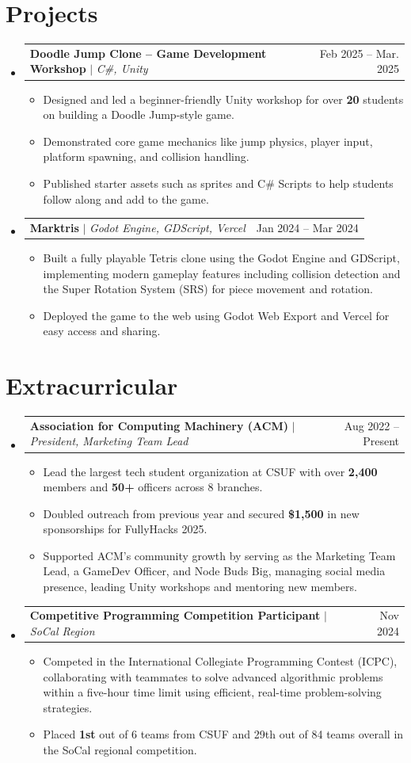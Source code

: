 \documentclass[letterpaper,11pt]{article}
\makeatletter
\newcommand{\resumeItem}[1]{
  \item\small{
    {#1 \vspace{-2pt}}
  }
}
\newcommand{\resumeProjectHeading}[2]{
    \item
    \begin{tabular*}{0.97\textwidth}{l@{\extracolsep{\fill}}r}
      \small#1 & #2 \\
    \end{tabular*}\vspace{-7pt}
}
\newcommand{\resumeSubHeadingListStart}{\begin{itemize}[leftmargin=0.15in, label={}]}
\newcommand{\resumeSubHeadingListEnd}{\end{itemize}}
\newcommand{\resumeItemListStart}{\begin{itemize}}
\newcommand{\resumeItemListEnd}{\end{itemize}\vspace{-5pt}}
\makeatother
\begin{document}
\section{Projects}
    \resumeSubHeadingListStart
      \resumeProjectHeading
          {\textbf{Doodle Jump Clone – Game Development Workshop} $|$ \emph{C\#, Unity}}{Feb 2025 -- Mar. 2025}
          \resumeItemListStart
            \resumeItem{Designed and led a beginner-friendly Unity workshop for over \textbf{20} students on building a Doodle Jump-style game.}
            \resumeItem{Demonstrated core game mechanics like jump physics, player input, platform spawning, and collision handling.}
            \resumeItem{Published starter assets such as sprites and C\# Scripts to help students follow along and add to the game.}
          \resumeItemListEnd
      \resumeProjectHeading
          {\textbf{Marktris} $|$ \emph{Godot Engine, GDScript, Vercel}}{Jan 2024 -- Mar 2024}
          \resumeItemListStart
            \resumeItem{Built a fully playable Tetris clone using the Godot Engine and GDScript, implementing modern gameplay features including collision detection and the Super Rotation System (SRS) for piece movement and rotation.}
            \resumeItem{Deployed the game to the web using Godot Web Export and Vercel for easy access and sharing.}
          \resumeItemListEnd
    \resumeSubHeadingListEnd

\section{Extracurricular}

    \resumeSubHeadingListStart
    
      \resumeProjectHeading
          {\textbf{Association for Computing Machinery (ACM)} $|$ \emph{President, Marketing Team Lead}}{Aug 2022 -- Present}
          \resumeItemListStart
            \resumeItem{Lead the largest tech student organization at CSUF with over \textbf{2,400} members and \textbf{50+} officers across 8 branches.}
            \resumeItem{Doubled outreach from previous year and secured \textbf{\$1,500} in new sponsorships for FullyHacks 2025.}
            \resumeItem{Supported ACM’s community growth by serving as the Marketing Team Lead, a GameDev Officer, and Node Buds Big, managing social media presence, leading Unity workshops and mentoring new members.}
          \resumeItemListEnd

      \resumeProjectHeading
          {\textbf{Competitive Programming Competition Participant} $|$ \emph{SoCal Region}}{Nov 2024}
          \resumeItemListStart
            \resumeItem{Competed in the International Collegiate Programming Contest (ICPC), collaborating with teammates to solve advanced algorithmic problems within a five-hour time limit using efficient, real-time problem-solving strategies.}
            \resumeItem{Placed \textbf{1st} out of 6 teams from CSUF and 29th out of 84 teams overall in the SoCal regional competition.}
          \resumeItemListEnd
          
    \resumeSubHeadingListEnd


\end{document}
